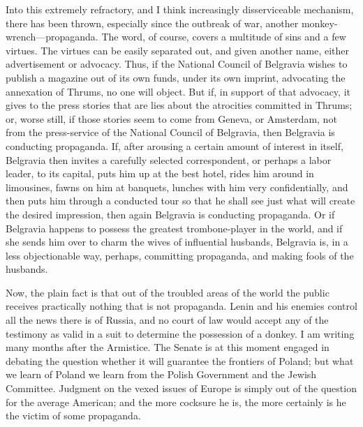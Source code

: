 \documentclass[openany,nobib,twoside,nohyper]{tufte-book}
\begin{document}
Into this extremely refractory, and I think increasingly disserviceable
mechanism, there has been thrown, especially since the outbreak of war,
another monkey-wrench---propaganda. The word, of course, covers a
multitude of sins and a few virtues. The virtues can be easily separated
out, and given another name, either advertisement or advocacy. Thus, if
the National Council of Belgravia wishes to publish a magazine out of
its own funds, under its own imprint, advocating the annexation of
Thrums, no one will object. But if, in support of that advocacy, it
gives to the press stories that are lies about the atrocities committed
in Thrums; or, worse still, if those stories seem to come from Geneva,
or Amsterdam, not from the press-service of the National Council of
Belgravia, then Belgravia is conducting propaganda. If, after arousing a
certain amount of interest in itself, Belgravia then invites a carefully
selected correspondent, or perhaps a labor leader, to its capital, puts
him up at the best hotel, rides him around in limousines, fawns on him
at banquets, lunches with him very confidentially, and then puts him
through a conducted tour so that he shall see just what will create the
desired impression, then again Belgravia is conducting propaganda. Or if
Belgravia happens to possess the greatest trombone-player in the world,
and if she sends him over to charm the wives of influential husbands,
Belgravia is, in a less objectionable way, perhaps, committing
propaganda, and making fools of the husbands.

Now, the plain fact is that out of the troubled areas of the world the
public receives practically nothing that is not propaganda. Lenin and
his enemies control all the news there is of Russia, and no court of law
would accept any of the testimony as valid in a suit to determine the
possession of a donkey. I am writing many months after the Armistice.
The Senate is at this moment engaged in debating the question whether it
will guarantee the frontiers of Poland; but what we learn of Poland we
learn from the Polish Government and the Jewish Committee. Judgment on
the vexed issues of Europe is simply out of the question for the average
American; and the more cocksure he is, the more certainly is he the
victim of some propaganda.
\end{document}
